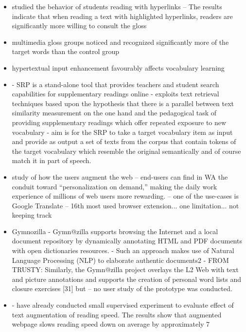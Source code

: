 \begin{itemize}
	\item \cite{DeRidder02-Links} studied the behavior of students reading with hyperlinks -- The results indicate that when reading a text with highlighted hyperlinks, readers are significantly more willing to consult the gloss 

	\item \cite{Yang09-Glosses} multimedia gloss groups noticed and recognized significantly more of the target words than the control group

	\item \cite{Sanko06-Effects} hypertextual input enhancement favourably affects vocabulary learning

	\item \cite{Wible01-Exposure} 
		- SRP is a stand-alone tool that provides teachers and student search capabilities for supplementary readings online
		- exploits text retrieval techniques based upon the hypothesis that there is a parallel between text similarity measurement on the one hand and the pedagogical task of providing supplementary readings which offer repeated exposure to new vocabulary
		- aim is for the SRP to take a target vocabulary item as input and provide as output a set of texts from the corpus that contain tokens of the target vocabulary which resemble the original semantically and of course match it in part of speech.

	\item \cite{Diaz15-Augmented} study of how the users augment the web -- end-users can find in WA the conduit toward “personalization on demand,” making the daily work experience of millions of web users more rewarding. -- one of the use-cases is Google Translate -- 16th most used browser extension... one limitation... not keeping track 

	\item Gymnozilla \cite{Streit05-Browsers} 
		- Gymn@zilla supports browsing the Internet and a local document repository by dynamically annotating HTML and PDF documents with open dictionaries resources.
		- Such an approach makes use of Natural Language Processing (NLP) to elaborate authentic documents2
		- FROM TRUSTY: Similarly, the Gymn@zilla project overlays the L2 Web with text and picture annotations and supports the creation of personal word lists and closure exercises [31] but 
		-- no user study of the prototype was conducted.

	\item \cite{Horva13-Enriching} 
	- have already conducted small supervised experiment to evaluate effect of text
	augmentation of reading speed. The results show that augmented webpage slows
	reading speed down on average by approximately 7%


\end{itemize}


